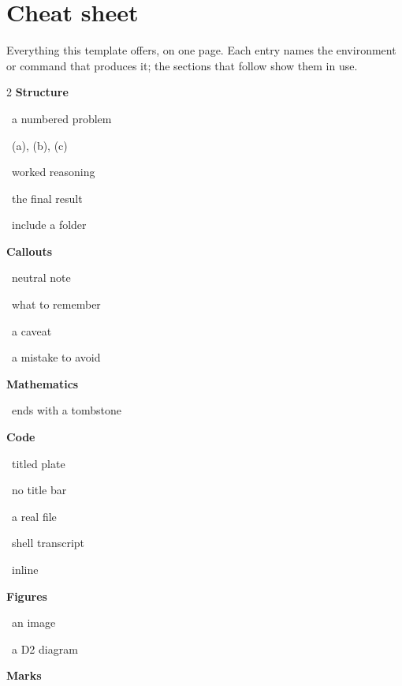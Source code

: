 \section{Cheat sheet}

Everything this template offers, on one page.
Each entry names the environment or command that produces it; the sections that follow show them in use.

\begin{multicols}{2}
\noindent
\textbf{\color{rzaccent}Structure}\par
{} \dotfill\ a numbered problem\par
{} \dotfill\ (a), (b), (c)\par
{} \dotfill\ worked reasoning\par
{} \dotfill\ the final result\par
{} \dotfill\ include a folder\par

\medskip
\noindent
\textbf{\color{rzaccent}Callouts}\par
{} \dotfill\ neutral note\par
{} \dotfill\ what to remember\par
{} \dotfill\ a caveat\par
{} \dotfill\ a mistake to avoid\par

\medskip
\noindent
\textbf{\color{rzaccent}Mathematics}\par
{}  \par
{}  \par
{} \dotfill\ ends with a tombstone\par

\columnbreak
\noindent
\textbf{\color{rzaccent}Code}\par
{} \dotfill\ titled plate\par
{} \dotfill\ no title bar\par
{} \dotfill\ a real file\par
{} \dotfill\ shell transcript\par
{}  \dotfill\ inline\par

\medskip
\noindent
\textbf{\color{rzaccent}Figures}\par
{} \dotfill\ an image\par
{} \dotfill\ a D2 diagram\par

\medskip
\noindent
\textbf{\color{rzaccent}Marks}\par
\rzcheck\  \quad
\rzcross\ \par
\rzwarnglyph\  \quad
\rzinfoglyph\ \par
\end{multicols}

